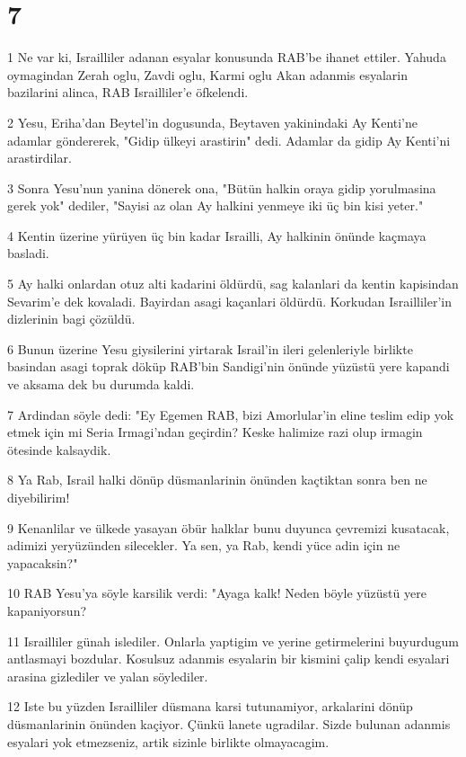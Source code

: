 \chapter{7}

\par 1 Ne var ki, Israilliler adanan esyalar konusunda RAB'be ihanet ettiler. Yahuda oymagindan Zerah oglu, Zavdi oglu, Karmi oglu Akan adanmis esyalarin bazilarini alinca, RAB Israilliler'e öfkelendi.
\par 2 Yesu, Eriha'dan Beytel'in dogusunda, Beytaven yakinindaki Ay Kenti'ne adamlar göndererek, "Gidip ülkeyi arastirin" dedi. Adamlar da gidip Ay Kenti'ni arastirdilar.
\par 3 Sonra Yesu'nun yanina dönerek ona, "Bütün halkin oraya gidip yorulmasina gerek yok" dediler, "Sayisi az olan Ay halkini yenmeye iki üç bin kisi yeter."
\par 4 Kentin üzerine yürüyen üç bin kadar Israilli, Ay halkinin önünde kaçmaya basladi.
\par 5 Ay halki onlardan otuz alti kadarini öldürdü, sag kalanlari da kentin kapisindan Sevarim'e dek kovaladi. Bayirdan asagi kaçanlari öldürdü. Korkudan Israilliler'in dizlerinin bagi çözüldü.
\par 6 Bunun üzerine Yesu giysilerini yirtarak Israil'in ileri gelenleriyle birlikte basindan asagi toprak döküp RAB'bin Sandigi'nin önünde yüzüstü yere kapandi ve aksama dek bu durumda kaldi.
\par 7 Ardindan söyle dedi: "Ey Egemen RAB, bizi Amorlular'in eline teslim edip yok etmek için mi Seria Irmagi'ndan geçirdin? Keske halimize razi olup irmagin ötesinde kalsaydik.
\par 8 Ya Rab, Israil halki dönüp düsmanlarinin önünden kaçtiktan sonra ben ne diyebilirim!
\par 9 Kenanlilar ve ülkede yasayan öbür halklar bunu duyunca çevremizi kusatacak, adimizi yeryüzünden silecekler. Ya sen, ya Rab, kendi yüce adin için ne yapacaksin?"
\par 10 RAB Yesu'ya söyle karsilik verdi: "Ayaga kalk! Neden böyle yüzüstü yere kapaniyorsun?
\par 11 Israilliler günah islediler. Onlarla yaptigim ve yerine getirmelerini buyurdugum antlasmayi bozdular. Kosulsuz adanmis esyalarin bir kismini çalip kendi esyalari arasina gizlediler ve yalan söylediler.
\par 12 Iste bu yüzden Israilliler düsmana karsi tutunamiyor, arkalarini dönüp düsmanlarinin önünden kaçiyor. Çünkü lanete ugradilar. Sizde bulunan adanmis esyalari yok etmezseniz, artik sizinle birlikte olmayacagim.
